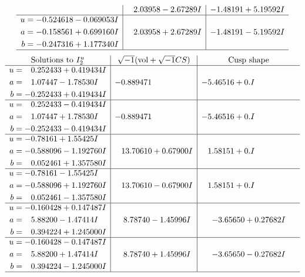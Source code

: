 \documentclass[1p]{elsarticle_modified}
\theoremstyle{definition}
\newcommand{\I}{\sqrt{-1}}
\begin{document}
$$\begin{array}{c|c|c}
 & \phantom{-}2.03958 - 2.67289 I & -1.48191 + 5.19592 I \\ \hline\begin{aligned}
u &= -0.524618 - 0.069053 I \\
a &= -0.158561 + 0.699160 I \\
b &= -0.247316 + 1.177340 I\end{aligned}
 & \phantom{-}2.03958 + 2.67289 I & -1.48191 - 5.19592 I\\
 \hline 
 \end{array}$$\newpage$$\begin{array}{c|c|c}  
\text{Solutions to }I^u_{2}& \I (\text{vol} + \sqrt{-1}CS) & \text{Cusp shape}\\
 \hline 
\begin{aligned}
u &= \phantom{-}0.252433 + 0.419434 I \\
a &= \phantom{-}1.07447 - 1.78530 I \\
b &= -0.252433 + 0.419434 I\end{aligned}
 & -0.889471\phantom{ +0.000000I} & -5.46516 + 0. I\phantom{ +0.000000I} \\ \hline\begin{aligned}
u &= \phantom{-}0.252433 - 0.419434 I \\
a &= \phantom{-}1.07447 + 1.78530 I \\
b &= -0.252433 - 0.419434 I\end{aligned}
 & -0.889471\phantom{ +0.000000I} & -5.46516 + 0. I\phantom{ +0.000000I} \\ \hline\begin{aligned}
u &= -0.78161 + 1.55425 I \\
a &= -0.588096 - 1.192760 I \\
b &= \phantom{-}0.052461 + 1.357580 I\end{aligned}
 & \phantom{-}13.70610 + 0.67900 I & \phantom{-}1.58151 + 0. I\phantom{ +0.000000I} \\ \hline\begin{aligned}
u &= -0.78161 - 1.55425 I \\
a &= -0.588096 + 1.192760 I \\
b &= \phantom{-}0.052461 - 1.357580 I\end{aligned}
 & \phantom{-}13.70610 - 0.67900 I & \phantom{-}1.58151 + 0. I\phantom{ +0.000000I} \\ \hline\begin{aligned}
u &= -0.160428 + 0.147487 I \\
a &= \phantom{-}5.88200 - 1.47414 I \\
b &= \phantom{-}0.394224 + 1.245000 I\end{aligned}
 & \phantom{-}8.78740 - 1.45996 I & -3.65650 + 0.27682 I \\ \hline\begin{aligned}
u &= -0.160428 - 0.147487 I \\
a &= \phantom{-}5.88200 + 1.47414 I \\
b &= \phantom{-}0.394224 - 1.245000 I\end{aligned}
 & \phantom{-}8.78740 + 1.45996 I & -3.65650 - 0.27682 I\\
 \hline 
 \end{array}$$\newpage\newpage\renewcommand{\arraystretch}{1}
\end{document}
